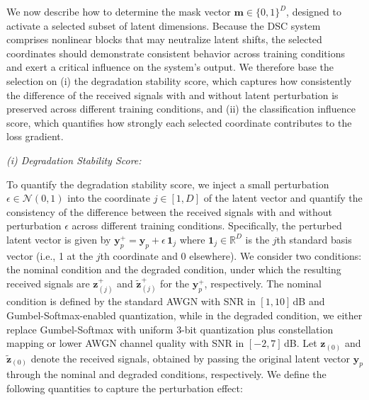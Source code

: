 \documentclass[journal]{IEEEtran}
\begin{document}
We now describe how to determine the mask vector \(\mathbf{m}\in\{0,1\}^{D}\), designed to activate a selected subset of latent dimensions. Because the DSC system comprises nonlinear blocks that may neutralize latent shifts, the selected coordinates should demonstrate consistent behavior across training conditions and 
exert a critical influence on the system's output.  
We therefore base the selection on (i) the degradation stability score, which captures how consistently the difference of the received signals with and without latent perturbation is preserved across different training conditions, 
and (ii) the classification influence score, which quantifies how strongly each selected coordinate contributes to the loss gradient.

\emph{(i) Degradation Stability Score:}  

To quantify the degradation stability score, we inject a small perturbation $\epsilon \in \mathcal{N}({0}, 1)$ into the coordinate \(j \in [1,D]\) of the latent vector and quantify the consistency of the difference between the received signals with and without perturbation $\epsilon$ across different training conditions.
Specifically, 
the perturbed latent vector is given by \(\mathbf{y}_p^{+} = \mathbf{y}_p + \epsilon \,\mathbf{1}_j\)
where 
\(\mathbf{1}_j \in \mathbb{R}^{D}\) is the \(j\)th standard basis vector (i.e., 1 at the \(j\)th coordinate and 0 elsewhere). 
We consider two conditions: the nominal condition and the degraded condition, under which the resulting received signals are
 \( {\mathbf{z}}_{(j)}^{+}\) and \(\tilde{\mathbf{z}}_{(j)}^{+}\) for the \( \mathbf{y}_p^{+}\), respectively. 
 The nominal condition is defined by the standard AWGN with SNR in $[1,10]$\,dB and Gumbel-Softmax-enabled quantization, while in the degraded condition, we either replace Gumbel-Softmax with uniform 3-bit quantization plus constellation mapping or lower AWGN channel quality with SNR in $[-2,7]$\,dB. Let \(  {\mathbf{z}}_{(0)}\) and  $\tilde{\mathbf{z}}_{(0)}$ denote the received signals, obtained by passing the original latent vector \(\mathbf{y}_p\) through the nominal and degraded conditions, respectively.
We define the following quantities {to capture the perturbation effect:}
\end{document}
